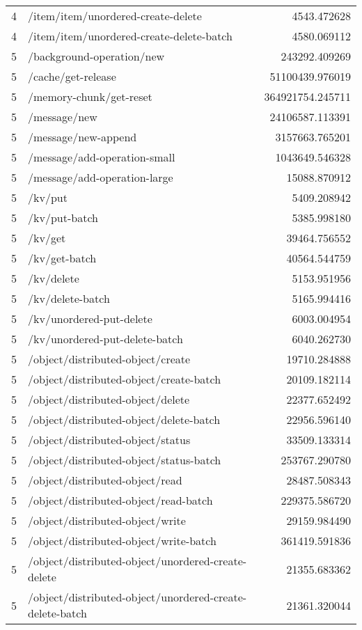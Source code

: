 \begin{longtable}{rlr}
4 & /item/item/unordered-create-delete & 4543.472628 \\
4 & /item/item/unordered-create-delete-batch & 4580.069112 \\
5 & /background-operation/new & 243292.409269 \\
5 & /cache/get-release & 51100439.976019 \\
5 & /memory-chunk/get-reset & 364921754.245711 \\
5 & /message/new & 24106587.113391 \\
5 & /message/new-append & 3157663.765201 \\
5 & /message/add-operation-small & 1043649.546328 \\
5 & /message/add-operation-large & 15088.870912 \\
5 & /kv/put & 5409.208942 \\
5 & /kv/put-batch & 5385.998180 \\
5 & /kv/get & 39464.756552 \\
5 & /kv/get-batch & 40564.544759 \\
5 & /kv/delete & 5153.951956 \\
5 & /kv/delete-batch & 5165.994416 \\
5 & /kv/unordered-put-delete & 6003.004954 \\
5 & /kv/unordered-put-delete-batch & 6040.262730 \\
5 & /object/distributed-object/create & 19710.284888 \\
5 & /object/distributed-object/create-batch & 20109.182114 \\
5 & /object/distributed-object/delete & 22377.652492 \\
5 & /object/distributed-object/delete-batch & 22956.596140 \\
5 & /object/distributed-object/status & 33509.133314 \\
5 & /object/distributed-object/status-batch & 253767.290780 \\
5 & /object/distributed-object/read & 28487.508343 \\
5 & /object/distributed-object/read-batch & 229375.586720 \\
5 & /object/distributed-object/write & 29159.984490 \\
5 & /object/distributed-object/write-batch & 361419.591836 \\
5 & /object/distributed-object/unordered-create-delete & 21355.683362 \\
5 & /object/distributed-object/unordered-create-delete-batch & 21361.320044 \\

\end{longtable}
